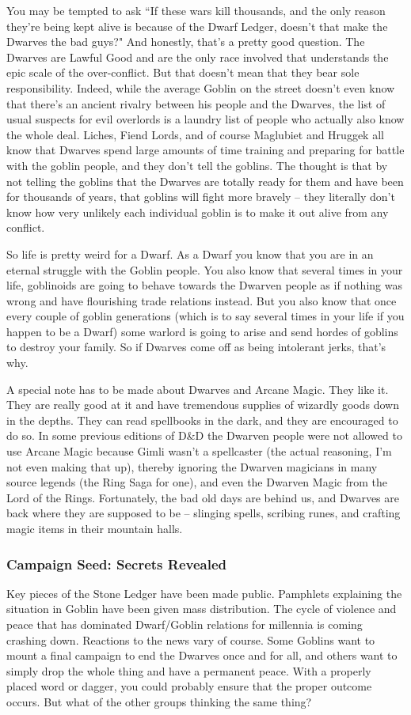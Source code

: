 You may be tempted to ask ``If these wars kill thousands, and the only reason they're being kept alive is because of the Dwarf Ledger, doesn't that make the Dwarves the bad guys?" And honestly, that's a pretty good question. The Dwarves are Lawful Good and are the only race involved that understands the epic scale of the over-conflict. But that doesn't mean that they bear sole responsibility. Indeed, while the average Goblin on the street doesn't even know that there's an ancient rivalry between his people and the Dwarves, the list of usual suspects for evil overlords is a laundry list of people who actually also know the whole deal. Liches, Fiend Lords, and of course Maglubiet and Hruggek all know that Dwarves spend large amounts of time training and preparing for battle with the goblin people, and they don't tell the goblins. The thought is that by not telling the goblins that the Dwarves are totally ready for them and have been for thousands of years, that goblins will fight more bravely -- they literally don't know how very unlikely each individual goblin is to make it out alive from any conflict.

So life is pretty weird for a Dwarf. As a Dwarf you know that you are in an eternal struggle with the Goblin people. You also know that several times in your life, goblinoids are going to behave towards the Dwarven people as if nothing was wrong and have flourishing trade relations instead. But you also know that once every couple of goblin generations (which is to say several times in your life if you happen to be a Dwarf) some warlord is going to arise and send hordes of goblins to destroy your family. So if Dwarves come off as being intolerant jerks, that's why.

A special note has to be made about Dwarves and Arcane Magic. They like it. They are really good at it and have tremendous supplies of wizardly goods down in the depths. They can read spellbooks in the dark, and they are encouraged to do so. In some previous editions of D\&D the Dwarven people were not allowed to use Arcane Magic because Gimli wasn't a spellcaster (the actual reasoning, I'm not even making that up), thereby ignoring the Dwarven magicians in many source legends (the Ring Saga for one), and even the Dwarven Magic from the Lord of the Rings. Fortunately, the bad old days are behind us, and Dwarves are back where they are supposed to be -- slinging spells, scribing runes, and crafting magic items in their mountain halls.

\subsubsection{Campaign Seed: Secrets Revealed}
Key pieces of the Stone Ledger have been made public. Pamphlets explaining the situation in Goblin have been given mass distribution. The cycle of violence and peace that has dominated Dwarf/Goblin relations for millennia is coming crashing down. Reactions to the news vary of course. Some Goblins want to mount a final campaign to end the Dwarves once and for all, and others want to simply drop the whole thing and have a permanent peace. With a properly placed word or dagger, you could probably ensure that the proper outcome occurs. But what of the other groups thinking the same thing?

